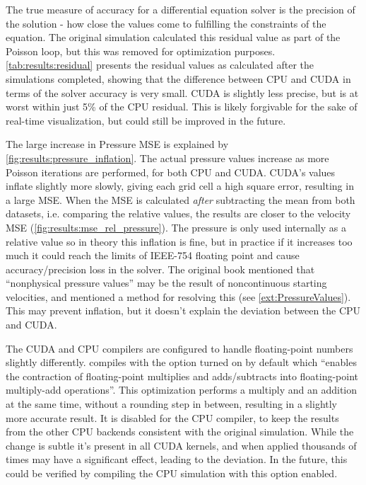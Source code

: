 



The true measure of accuracy for a differential equation solver is the precision of the solution - how close the values come to fulfilling the constraints of the equation.
The original simulation calculated this residual value as part of the Poisson loop, but this was removed for optimization purposes.
\cref{tab:results:residual} presents the residual values as calculated after the simulations completed, showing that the difference between CPU and CUDA in terms of the solver accuracy is very small.
CUDA is slightly less precise, but is at worst within just 5\% of the CPU residual.
This is likely forgivable for the sake of real-time visualization, but could still be improved in the future.




The large increase in Pressure MSE is explained by \cref{fig:results:pressure_inflation}.
The actual pressure values increase as more Poisson iterations are performed, for both CPU and CUDA.
CUDA's values inflate slightly more slowly, giving each grid cell a high square error, resulting in a large MSE.
When the MSE is calculated \emph{after} subtracting the mean from both datasets, i.e. comparing the relative values, the results are closer to the velocity MSE (\cref{fig:results:mse_rel_pressure}).
The pressure is only used internally as a relative value so in theory this inflation is fine, but in practice if it increases too much it could reach the limits of IEEE-754 floating point\cite{IEEEFloat75419} and cause accuracy/precision loss in the solver.
The original book mentioned that ``nonphysical pressure values'' may be the result of noncontinuous starting velocities\cite{book:griebel1998numerical}, and mentioned a method for resolving this (see \cref{ext:PressureValues}). This may prevent inflation, but it doesn't explain the deviation between the CPU and CUDA.

The CUDA and CPU compilers are configured to handle floating-point numbers slightly differently.
 compiles with the  option turned on by default\cite{NvccFmad} which ``enables the contraction of floating-point multiplies and adds/subtracts into floating-point multiply-add operations''.
This optimization performs a multiply and an addition at the same time, without a rounding step in between, resulting in a slightly more accurate result\cite{NvidiaFMAJustification}.
It is disabled for the CPU compiler, to keep the results from the other CPU backends consistent with the original simulation.
While the change is subtle it's present in all CUDA kernels, and when applied thousands of times may have a significant effect, leading to the deviation.
In the future, this could be verified by compiling the CPU simulation with this option enabled.


